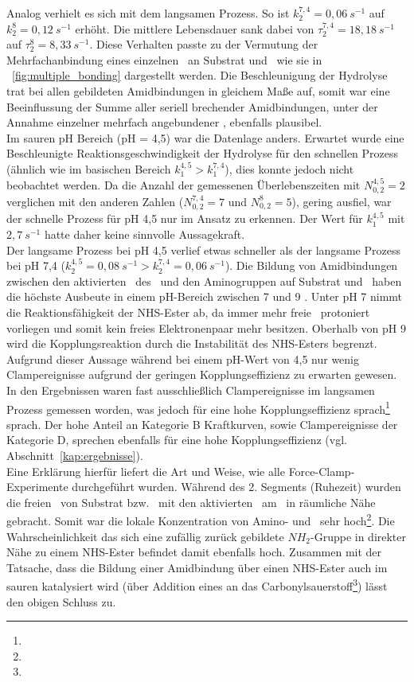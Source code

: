 Analog verhielt es sich mit dem langsamen Prozess. So ist $k_2^{7,4} = 0,06~s^{-1}$ auf $k_2^8 = 0,12~s^{-1}$ erhöht. Die mittlere Lebensdauer sank dabei von $\tau_2^{7,4} = 18,18~s^{-1}$ auf $\tau_2^8 = 8,33~s^{-1}$. Diese Verhalten passte zu der Vermutung der Mehrfachanbindung eines einzelnen \spacer~an Substrat und \spitze~wie sie in \abb~\ref{fig:multiple_bonding} dargestellt werden. Die Beschleunigung der Hydrolyse trat bei allen gebildeten Amidbindungen in gleichem Maße auf, somit war eine Beeinflussung der Summe aller seriell brechender Amidbindungen, unter der Annahme einzelner mehrfach angebundener \spacer, ebenfalls plausibel.\\
Im sauren pH Bereich (pH = 4,5) war die Datenlage anders. Erwartet wurde eine Beschleunigte Reaktionsgeschwindigkeit der Hydrolyse für den schnellen Prozess (ähnlich wie im basischen Bereich $k_1^{4,5} > k_1^{7,4}$), dies konnte jedoch nicht beobachtet werden. Da die Anzahl der gemessenen Überlebenszeiten mit $N_{0,2}^{4,5} = 2$ verglichen mit den anderen Zahlen ($N_{0,2}^{7,4} = 7$ und $N_{0,2}^8 = 5$), gering ausfiel, war der schnelle Prozess für pH 4,5 nur im Ansatz zu erkennen. Der Wert für $k_1^{4,5} $ mit $2,7~s^{-1}$ hatte daher keine sinnvolle Aussagekraft.\\
Der langsame Prozess bei pH 4,5 verlief etwas schneller als der langsame Prozess bei pH 7,4 ($k_2^{4,5} = 0,08~s^{-1} > k_2^{7,4} = 0,06~s^{-1}$). Die Bildung von Amidbindungen zwischen den aktivierten \carboxys~des \spacers~und den Aminogruppen auf Substrat und \spitze~haben die höchste Ausbeute in einem pH-Bereich zwischen 7 und 9 \cites{Hayworth}[69]{Fischer.2010}{Nojima.2009}. Unter pH 7 nimmt die Reaktionsfähigkeit der \ac{NHS}-Ester ab, da immer mehr freie \aminos~protoniert vorliegen und somit kein freies Elektronenpaar mehr besitzen. Oberhalb von pH 9 wird die Kopplungsreaktion durch die Instabilität des \ac{NHS}-Esters begrenzt. Aufgrund dieser Aussage während bei einem pH-Wert von 4,5 nur wenig Clampereignisse aufgrund der geringen Kopplungseffizienz zu erwarten gewesen. In den Ergebnissen waren fast ausschließlich Clampereignisse im langsamen Prozess gemessen worden, was jedoch für eine hohe Kopplungseffizienz sprach\footnote{\noteOne} sprach. Der hohe Anteil an Kategorie B Kraftkurven, sowie Clampereignisse der Kategorie D, sprechen ebenfalls für eine hohe Kopplungseffizienz (vgl. Abschnitt~\ref{kap:ergebnisse}).\\
Eine Erklärung hierfür liefert die Art und Weise, wie alle Force-Clamp-Experimente durchgeführt wurden. Während des 2. Segments (Ruhezeit) wurden die freien \aminos~von Substrat bzw. \spitze~mit den aktivierten \carboxys~am \spacer~in räumliche Nähe gebracht. Somit war die lokale Konzentration von Amino- und \carboxys~sehr hoch\footnote{\noteTwo}. Die Wahrscheinlichkeit das sich eine zufällig zurück gebildete $NH_2$-Gruppe in direkter Nähe zu einem \ac{NHS}-Ester befindet damit ebenfalls hoch. Zusammen mit der Tatsache, dass die Bildung einer Amidbindung über einen \ac{NHS}-Ester auch im sauren katalysiert wird (über Addition eines  an das Carbonylsauerstoff\footnote{\noteThree}) \cite[10828]{Montalbetti.2005} lässt den obigen Schluss zu.\\

